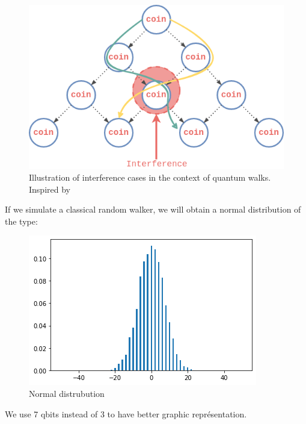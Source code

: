 \documentclass[9pt,journal,compsoc]{IEEEtran}
\begin{document}
        \begin{figure}[htp!]
            \centering
            \includegraphics[width=\linewidth]{assets/img/schema4.png}
            \caption{Illustration of interference cases in the context of quantum walks. Inspired by \cite{AuantumEconomicsAndFinance2021}}
            \label{fig:opposing}
        \end{figure}
        If we simulate a classical random walker, we will obtain a normal distribution of the type:
        \begin{figure}[htp!]
            \centering
            \includegraphics[scale=0.4]{assets/img/normal.png}
            \caption{Normal distrubution \cite{QuantumDemoDauliac2022}}
            \label{fig:opposing}
        \end{figure}
        We use 7 qbits instead of 3 to have better graphic représentation.
\end{document}
